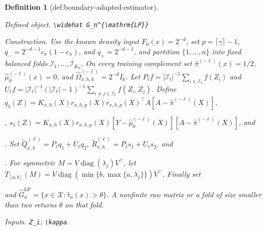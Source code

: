 \documentclass{article}
\newtheorem{definition}{Definition}
\begin{document}
\begin{definition}[def:boundary-adapted-estimator]\label{def:boundary-adapted-estimator}
\par\smallskip\noindent\emph{Defined object.} \texttt{\textbackslash{}\allowbreak{}widehat G\_\allowbreak{}n\textasciicircum{}\{\textbackslash{}\allowbreak{}mathrm\{LP\}\allowbreak{}\}\allowbreak{}}
\par\smallskip\noindent\emph{Construction.} Use the known density input \(F_0(x)=2^{-d}\), set \(p=\lceil\gamma\rceil-1\), \(q_-=2^{-d-1}c_\pi(1-c_\pi)\), and \(q_+=2^{-d-1}\), and partition \(\{1,\ldots,n\}\) into fixed balanced folds \(\mathcal I_1,\ldots,\mathcal I_{K_0}\). On every training complement set \(\widehat\pi^{(-\ell)}(x)=1/2\), \(\widehat\mu_0^{(-\ell)}(x)=0\), and \(\widehat\Omega^{(-\ell)}_{x,h,k}=2^{-d}I_k\). Let \(P_\ell f=|\mathcal I_\ell|^{-1}\sum_{i\in\mathcal I_\ell}f(Z_i)\) and \(U_\ell f=|\mathcal I_\ell|^{-1}(|\mathcal I_\ell|-1)^{-1}\sum_{i\ne j\in\mathcal I_\ell}f(Z_i,Z_j)\). Define \(q_1(Z)=K_{x,h}(X)r_{x,h,p}(X)r_{x,h,p}(X)^\top A[A-\widehat\pi^{(-\ell)}(X)]\), \leavevmode\par\noindent {}\par\noindent, \(s_1(Z)=K_{x,h}(X)r_{x,h,p}(X)[Y-\widehat\mu_0^{(-\ell)}(X)][A-\widehat\pi^{(-\ell)}(X)]\), and \leavevmode\par\noindent {}\par\noindent. Set \(\widetilde Q^{(\ell)}_{x,h}=P_\ell q_1+U_\ell q_2\), \(\widetilde R^{(\ell)}_{x,h}=P_\ell s_1+U_\ell s_2\), and \leavevmode\par\noindent {}\par\noindent. For symmetric \(M=V\operatorname{diag}(\lambda_j)V^\top\), let \(T_{[a,b]}(M)=V\operatorname{diag}(\min\{b,\max\{a,\lambda_j\}\})V^\top\). Finally set \leavevmode\par\noindent {}\par\noindent and \(\widehat G_n^{\mathrm{LP}}=\{x\in\mathcal X:\widehat\tau_n(x)>\theta\}\). A nonfinite raw matrix or a fold of size smaller than two returns \(\theta\) on that fold.
\par\smallskip\noindent\emph{Inputs.} \texttt{Z\_\allowbreak{}i}; \texttt{\textbackslash{}\allowbreak{}kappa}.
\end{definition}
\end{document}
